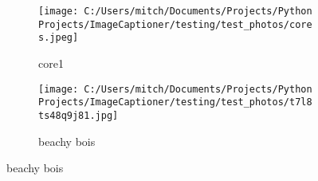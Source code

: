 \documentclass{article}%
\begin{document}
%
\normalsize%


\begin{figure}[ht]%
\centering%
\captionsetup[subfigure]{labelformat=empty}%
\begin{subfigure}[t]{0.45\linewidth}%
\centering%
\texttt{[image: C:/Users/mitch/Documents/Projects/Python Projects/ImageCaptioner/testing/test\_photos/cores.jpeg]}%
\caption{core1}%
\end{subfigure}%
\hfill%
\begin{subfigure}[t]{0.45\linewidth}%
\centering%
\texttt{[image: C:/Users/mitch/Documents/Projects/Python Projects/ImageCaptioner/testing/test\_photos/t7l8ts48q9j81.jpg]}%
\caption{beachy bois}%
\end{subfigure}%
\hfill%
\end{figure}

%
\end{document}
